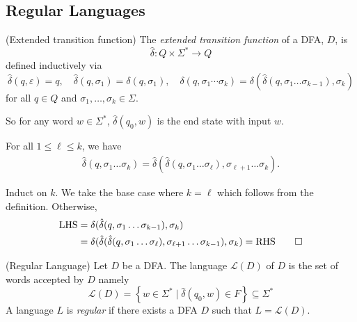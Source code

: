 \documentclass[tikx, border = 10pt]{article}
\begin{document}
\subsection{Regular Languages}
\begin{definition}
	(Extended transition function) The \textit{extended transition function} of a DFA, $ D $, is
	\[
	  \hat\delta: Q \times \Sigma^* \to Q
	\]
	defined inductively via
	\[
		\hat \delta(q, \varepsilon) = q, \quad \hat\delta(q, \sigma_1) = \delta(q, \sigma_1), \quad \delta(q, \sigma_1\cdots \sigma_k) = \delta(\hat\delta(q,\sigma_1\dots \sigma_{k-1}), \sigma_k)
	\]
	for all $ q\in Q $ and $ \sigma_1,\dots, \sigma_k\in \Sigma $.
\end{definition}
So for any word $ w\in \Sigma^* $, $ \hat\delta(q_0,w) $ is the end state with input $ w $.
\begin{lemma}
  For all $ 1\le \ell \le k $, we have 
  \begin{align*}
	  \hat\delta(q, \sigma_1\dots \sigma_k) = \hat\delta( \hat\delta(q,\sigma_1 \dots\sigma_\ell), \sigma_{\ell +1} \dots \sigma_k).
  \end{align*}
\end{lemma}
\pf Induct on $ k $. We take the base case where $ k = \ell $ which follows from the definition. Otherwise,
\begin{align*}
	\text{LHS} & = \delta(\hat\delta(q, \sigma_1 \dots \sigma_{k-1}), \sigma_k)\\
		   &= \delta(\hat\delta(\hat\delta(q,\sigma_1\dots \sigma_\ell), \sigma_{\ell +1}\dots \sigma_{k-1}), \sigma_k) = \text{RHS}\qed
\end{align*}
\begin{definition}
	(Regular Language) Let $ D $ be a DFA. The language $\mathcal L(D) $ of $ D $ is the set of words accepted by $ D $ namely
	\[
		\mathcal L(D) = \left\{ w \in \Sigma^* \mid \hat\delta (q_0, w) \in F\right\} \subseteq \Sigma^*
	\]
	A language $ L $ is \textit{regular} if there exists a DFA $ D $ such that $ L = \mathcal L(D) $.
\end{definition}
\end{document}
